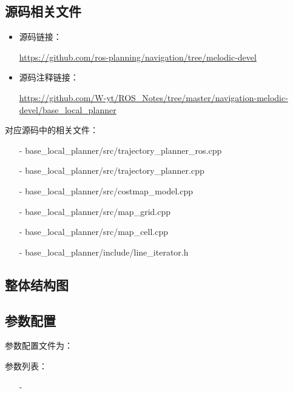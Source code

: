 \documentclass[9pt, oneside]{book}
\begin{document}
\subsection{源码相关文件}

\begin{itemize}
    \item 源码链接：
    
    \url{https://github.com/ros-planning/navigation/tree/melodic-devel}

    \item 源码注释链接：
    
    \small
    \url{https://github.com/W-yt/ROS_Notes/tree/master/navigation-melodic-devel/base_local_planner}
    \normalsize
\end{itemize}

对应源码中的相关文件：

\begin{itemize}
    \item [-] base\_local\_planner/src/trajectory\_planner\_ros.cpp
    \item [-] base\_local\_planner/src/trajectory\_planner.cpp
    \item [-] base\_local\_planner/src/costmap\_model.cpp
    \item [-] base\_local\_planner/src/map\_grid.cpp
    \item [-] base\_local\_planner/src/map\_cell.cpp
    \item [-] base\_local\_planner/include/line\_iterator.h
\end{itemize}

\subsection{整体结构图}


\subsection{参数配置}

参数配置文件为：

参数列表：

\begin{itemize}
    \item [-] 
\end{itemize}
\end{document}

